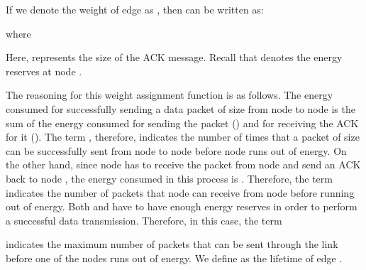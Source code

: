 \documentclass[journal,12pt,onecolumn]{IEEEtran}
\begin{document}
If we denote the weight of edge  as , then  can be written as:

where

Here,  represents
the size of the ACK message. Recall that  denotes the energy
reserves at node . 

The reasoning for this weight assignment function is as follows. The
energy consumed for successfully sending a data packet of size 
from node  to node  is the sum of the energy consumed for
sending the packet () and for receiving the ACK for it
(). The term , therefore, indicates the
number of times that a packet of size  can be successfully sent
from node  to node  before node  runs out of energy.
On the other hand, since node  has to receive the packet from
node  and send an ACK back to node , the energy consumed
in this process is . Therefore, the term
 indicates the number of packets that node
 can receive from node  before running out of energy. Both
 and  have to have enough energy reserves in order to
perform a successful data transmission. Therefore, in this case, the
term

indicates the maximum number of packets that can be sent through the
link  before one of the nodes runs out of
energy. We define  as the lifetime of edge .
\end{document}
